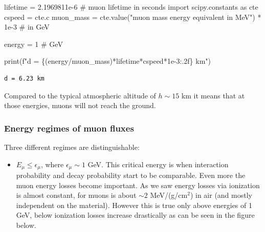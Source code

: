 \documentclass[
  letterpaper,
  DIV=11,
  numbers=noendperiod]{scrreprt}
\newenvironment{Shaded}{\begin{snugshade}}{\end{snugshade}}
\newcommand{\BuiltInTok}[1]{\textcolor[rgb]{0.00,0.23,0.31}{#1}}
\newcommand{\CommentTok}[1]{\textcolor[rgb]{0.37,0.37,0.37}{#1}}
\newcommand{\DecValTok}[1]{\textcolor[rgb]{0.68,0.00,0.00}{#1}}
\newcommand{\FloatTok}[1]{\textcolor[rgb]{0.68,0.00,0.00}{#1}}
\newcommand{\ImportTok}[1]{\textcolor[rgb]{0.00,0.46,0.62}{#1}}
\newcommand{\NormalTok}[1]{\textcolor[rgb]{0.00,0.23,0.31}{#1}}
\newcommand{\OperatorTok}[1]{\textcolor[rgb]{0.37,0.37,0.37}{#1}}
\newcommand{\SpecialCharTok}[1]{\textcolor[rgb]{0.37,0.37,0.37}{#1}}
\newcommand{\SpecialStringTok}[1]{\textcolor[rgb]{0.13,0.47,0.30}{#1}}
\newcommand{\StringTok}[1]{\textcolor[rgb]{0.13,0.47,0.30}{#1}}
\providecommand{\tightlist}{%
  \setlength{\itemsep}{0pt}\setlength{\parskip}{0pt}}\usepackage{longtable,booktabs,array}
\begin{document}
\begin{Shaded}
\begin{Highlighting}[]
\NormalTok{lifetime }\OperatorTok{=} \FloatTok{2.1969811e{-}6} \CommentTok{\# muon lifetime in seconds}
\ImportTok{import}\NormalTok{ scipy.constants }\ImportTok{as}\NormalTok{ cte}
\NormalTok{cspeed }\OperatorTok{=}\NormalTok{ cte.c}
\NormalTok{muon\_mass }\OperatorTok{=}\NormalTok{ cte.value(}\StringTok{"muon mass energy equivalent in MeV"}\NormalTok{) }\OperatorTok{*} \FloatTok{1e{-}3} \CommentTok{\# in GeV}

\NormalTok{energy }\OperatorTok{=} \DecValTok{1} \CommentTok{\# GeV}

\BuiltInTok{print}\NormalTok{(}\SpecialStringTok{f"d = }\SpecialCharTok{\{}\NormalTok{(energy}\OperatorTok{/}\NormalTok{muon\_mass)}\OperatorTok{*}\NormalTok{lifetime}\OperatorTok{*}\NormalTok{cspeed}\OperatorTok{*}\FloatTok{1e{-}3}\SpecialCharTok{:.2f\}}\SpecialStringTok{ km"}\NormalTok{)}
\end{Highlighting}
\end{Shaded}

\begin{verbatim}
d = 6.23 km
\end{verbatim}

Compared to the typical atmospheric altitude of \(h \sim 15\) km it
means that at those energies, muons will not reach the ground.

\subsubsection*{Energy regimes of muon
fluxes}\label{energy-regimes-of-muon-fluxes}

Three different regimes are distinguishable:

\begin{itemize}
\tightlist
\item
  \(E_\mu \leq \epsilon_\mu\), where \(\epsilon_\mu \sim 1\) GeV. This
  critical energy is when interaction probability and decay probability
  start to be comparable. Even more the muon energy losses become
  important. As we saw energy losses via ionization is almost constant,
  for muons is about \(\sim 2\) MeV/(g/cm\(^{2}\)) in air (and mostly
  independent on the material). However this is true only above energies
  of 1 GeV, below ionization losses increase drastically as can be seen
  in the figure below.
\end{itemize}
\end{document}
